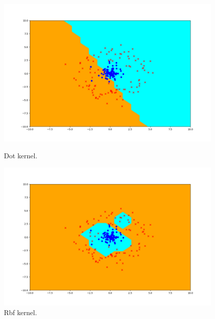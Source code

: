\begin{answer}
\begin{figure}
  \includegraphics[width=\linewidth]{perceptron_dot_output.png}
  \caption{Dot kernel.}
  \label{fig:dot kernel}
  \includegraphics[width=\linewidth]{perceptron_rbf_output.png}
  \caption{Rbf kernel.}
  \label{fig:rbf kernel}
\end{figure}
\end{answer}
